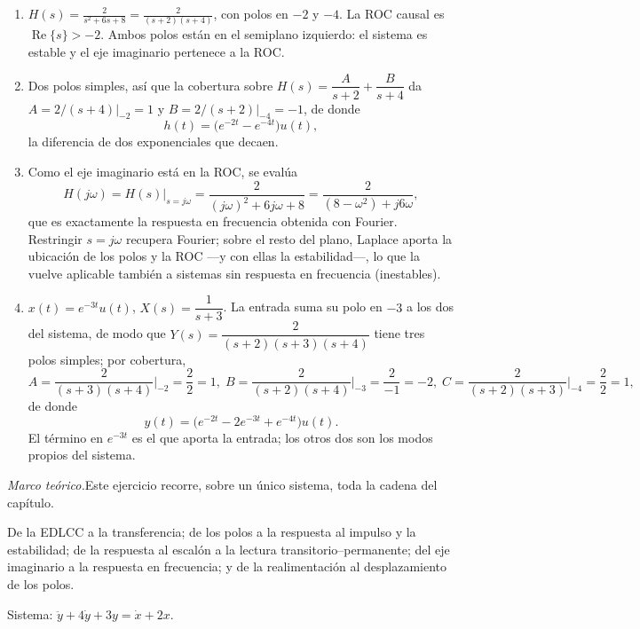 \documentclass[10pt,a4paper]{article}
\newcommand{\ejercicio}[1]{\bigskip\noindent{\large\textbf{Ejercicio #1}}\par\nobreak\smallskip}
\newcommand{\teoria}[1]{\noindent\textit{Marco teórico.}\enspace #1\par\smallskip}
\begin{document}
\begin{enumerate}
	\item $\displaystyle H(s)=\frac{2}{s^2+6s+8}=\frac{2}{(s+2)(s+4)}$, con
	polos en $-2$ y $-4$. La ROC causal es $\operatorname{Re}\{s\}>-2$.
	Ambos polos están en el semiplano izquierdo: el sistema es estable y el
	eje imaginario pertenece a la ROC.

	\item Dos polos simples, así que la cobertura sobre
	$H(s)=\dfrac{A}{s+2}+\dfrac{B}{s+4}$ da $A=2/(s+4)|_{-2}=1$ y
	$B=2/(s+2)|_{-4}=-1$, de donde
	\[
		h(t)=\bigl(e^{-2t}-e^{-4t}\bigr)u(t),
	\]
	la diferencia de dos exponenciales que decaen.

	\item Como el eje imaginario está en la ROC, se evalúa
	\[
		H(j\omega)=H(s)\big|_{s=j\omega}
		         =\frac{2}{(j\omega)^2+6j\omega+8}
		         =\frac{2}{(8-\omega^2)+j6\omega},
	\]
	que es exactamente la respuesta en frecuencia obtenida con Fourier.
	Restringir $s=j\omega$ recupera Fourier; sobre el resto del plano,
	Laplace aporta la ubicación de los polos y la ROC ---y con ellas la
	estabilidad---, lo que la vuelve aplicable también a sistemas sin
	respuesta en frecuencia (inestables).

	\item $x(t)=e^{-3t}u(t)$, $X(s)=\dfrac{1}{s+3}$. La entrada suma su polo en
	$-3$ a los dos del sistema, de modo que
	$Y(s)=\dfrac{2}{(s+2)(s+3)(s+4)}$ tiene tres polos simples; por cobertura,
	\[
		A=\frac{2}{(s+3)(s+4)}\bigg|_{-2}=\frac{2}{2}=1,\;
		B=\frac{2}{(s+2)(s+4)}\bigg|_{-3}=\frac{2}{-1}=-2,\;
		C=\frac{2}{(s+2)(s+3)}\bigg|_{-4}=\frac{2}{2}=1,
	\]
	de donde
	\[
		y(t)=\bigl(e^{-2t}-2e^{-3t}+e^{-4t}\bigr)u(t).
	\]
	El término en $e^{-3t}$ es el que aporta la entrada; los otros dos son los
	modos propios del sistema.
\end{enumerate}

\ejercicio{16: integrador}

\teoria{Este ejercicio recorre, sobre un único sistema, toda la cadena del
capítulo.

De la EDLCC a la transferencia; de los polos a la respuesta al impulso y la
estabilidad; de la respuesta al escalón a la lectura transitorio--permanente;
del eje imaginario a la respuesta en frecuencia; y de la realimentación al
desplazamiento de los polos.}

Sistema: $\ddot y+4\dot y+3y=\dot x+2x$.
\end{document}

